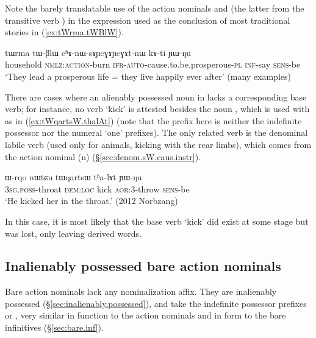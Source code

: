 Note the barely translatable use of the action nominals  and  (the latter from the transitive verb ) in the expression used as the conclusion of most traditional stories in (\ref{ex:tWrma.tWBlW}).

\begin{exe}
\ex \label{ex:tWrma.tWBlW}
\gll  tɯrma tɯ-βlɯ cʰɤ-nɯ-sɤɲcɣɤɲcɣɤt-nɯ kɤ-ti ɲɯ-ŋu \\
household \textsc{nmlz}:\textsc{action}-burn \textsc{ifr}-\textsc{auto}-cause.to.be.prosperous-\textsc{pl} \textsc{inf}-say \textsc{sens}-be \\
\glt `They lead a prosperous life = they live happily ever after' (many examples)
\end{exe}


There are cases where an alienably possessed noun in  lacks a corresponding base verb; for instance, no verb  `kick' is attested besides the noun , which is used with  as in (\ref{ex:tWqartsW.thalAt}) (note that the  prefix here is neither the indefinite possessor nor the numeral `one' prefixes). The only related verb is the denominal labile verb  (used only for animals, kicking with the rear limbs), which comes from the action nominal  (n) (§\ref{sec:denom.sW.caus.instr}).

\begin{exe}
\ex \label{ex:tWqartsW.thalAt}
\gll  ɯ-rqo nɯtɕu tɯqartsɯ tʰa-lɤt ɲɯ-ŋu \\
\textsc{3sg}.\textsc{poss}-throat \textsc{dem}:\textsc{loc} kick \textsc{aor}:3\flobv{}-throw \textsc{sens}-be \\
\glt `He kicked her in the throat.' (2012 Norbzang) 	
\end{exe}

In this case, it is most likely that the base verb  `kick' did exist at some stage but was lost, only leaving derived words.

\subsection{Inalienably possessed bare action nominals} \label{sec:bare.action.nominals}
Bare action nominals lack any nominalization affix. They are inalienably possessed (§\ref{sec:inalienably.possessed}), and take the indefinite possessor prefixes  or , very similar in function to the  action nominals and in form to the bare infinitives (§\ref{sec:bare.inf}).

